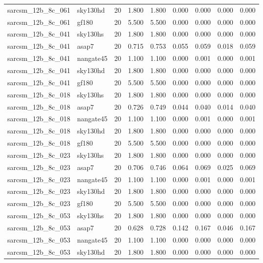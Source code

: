 \begin{tabular}{llrrrrrrr}
sarcsm\_12b\_8c\_061 & sky130hd & 20 & 1.800 & 1.800 & 0.000 & 0.000 & 0.000 & 0.000 \\
sarcsm\_12b\_8c\_061 & gf180 & 20 & 5.500 & 5.500 & 0.000 & 0.000 & 0.000 & 0.000 \\
sarcsm\_12b\_8c\_041 & sky130hs & 20 & 1.800 & 1.800 & 0.000 & 0.000 & 0.000 & 0.000 \\
sarcsm\_12b\_8c\_041 & asap7 & 20 & 0.715 & 0.753 & 0.055 & 0.059 & 0.018 & 0.059 \\
sarcsm\_12b\_8c\_041 & nangate45 & 20 & 1.100 & 1.100 & 0.000 & 0.001 & 0.000 & 0.001 \\
sarcsm\_12b\_8c\_041 & sky130hd & 20 & 1.800 & 1.800 & 0.000 & 0.000 & 0.000 & 0.000 \\
sarcsm\_12b\_8c\_041 & gf180 & 20 & 5.500 & 5.500 & 0.000 & 0.000 & 0.000 & 0.000 \\
sarcsm\_12b\_8c\_018 & sky130hs & 20 & 1.800 & 1.800 & 0.000 & 0.000 & 0.000 & 0.000 \\
sarcsm\_12b\_8c\_018 & asap7 & 20 & 0.726 & 0.749 & 0.044 & 0.040 & 0.014 & 0.040 \\
sarcsm\_12b\_8c\_018 & nangate45 & 20 & 1.100 & 1.100 & 0.000 & 0.001 & 0.000 & 0.001 \\
sarcsm\_12b\_8c\_018 & sky130hd & 20 & 1.800 & 1.800 & 0.000 & 0.000 & 0.000 & 0.000 \\
sarcsm\_12b\_8c\_018 & gf180 & 20 & 5.500 & 5.500 & 0.000 & 0.000 & 0.000 & 0.000 \\
sarcsm\_12b\_8c\_023 & sky130hs & 20 & 1.800 & 1.800 & 0.000 & 0.000 & 0.000 & 0.000 \\
sarcsm\_12b\_8c\_023 & asap7 & 20 & 0.706 & 0.746 & 0.064 & 0.069 & 0.025 & 0.069 \\
sarcsm\_12b\_8c\_023 & nangate45 & 20 & 1.100 & 1.100 & 0.000 & 0.001 & 0.000 & 0.001 \\
sarcsm\_12b\_8c\_023 & sky130hd & 20 & 1.800 & 1.800 & 0.000 & 0.000 & 0.000 & 0.000 \\
sarcsm\_12b\_8c\_023 & gf180 & 20 & 5.500 & 5.500 & 0.000 & 0.000 & 0.000 & 0.000 \\
sarcsm\_12b\_8c\_053 & sky130hs & 20 & 1.800 & 1.800 & 0.000 & 0.000 & 0.000 & 0.000 \\
sarcsm\_12b\_8c\_053 & asap7 & 20 & 0.628 & 0.728 & 0.142 & 0.167 & 0.046 & 0.167 \\
sarcsm\_12b\_8c\_053 & nangate45 & 20 & 1.100 & 1.100 & 0.000 & 0.000 & 0.000 & 0.000 \\
sarcsm\_12b\_8c\_053 & sky130hd & 20 & 1.800 & 1.800 & 0.000 & 0.000 & 0.000 & 0.000 \\

\end{tabular}
